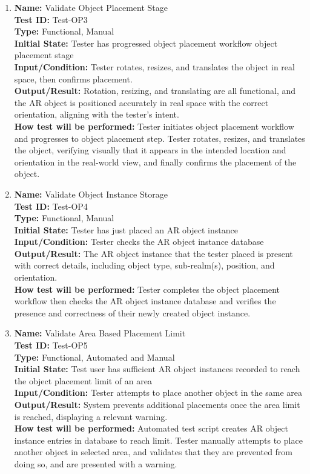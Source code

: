 \documentclass[12pt, titlepage]{article}
\begin{document}
\begin{enumerate}
\item \textbf{Name:} Validate Object Placement Stage \label{itm:Test-OP3} \\
\textbf{Test ID:} Test-OP3 \\
\textbf{Type:} Functional, Manual \\
\textbf{Initial State:} Tester has progressed object placement workflow object placement stage \\
\textbf{Input/Condition:} Tester rotates, resizes, and translates the object in real space, then confirms placement. \\
\textbf{Output/Result:} Rotation, resizing, and translating are all functional, and the AR object is positioned accurately in real space with the correct orientation, aligning with the tester's intent. \\
\textbf{How test will be performed:} Tester initiates object placement workflow and progresses to object placement step. Tester rotates, resizes, and translates the object, verifying visually that it appears in the intended location and orientation in the real-world view, and finally confirms the placement of the object.

\item \textbf{Name:} Validate Object Instance Storage \label{itm:Test-OP4} \\
\textbf{Test ID:} Test-OP4 \\
\textbf{Type:} Functional, Manual \\
\textbf{Initial State:} Tester has just placed an AR object instance \\
\textbf{Input/Condition:} Tester checks the AR object instance database \\
\textbf{Output/Result:} The AR object instance that the tester placed is present with correct details, including object type, sub-realm(s), position, and orientation. \\
\textbf{How test will be performed:} Tester completes the object placement workflow then checks the AR object instance database and verifies the presence and correctness of their newly created object instance.


\item \textbf{Name:} Validate Area Based Placement Limit \label{itm:Test-OP5} \\
\textbf{Test ID:} Test-OP5 \\
\textbf{Type:} Functional, Automated and Manual \\
\textbf{Initial State:} Test user has sufficient AR object instances recorded to reach the object placement limit of an area  \\
\textbf{Input/Condition:} Tester attempts to place another object in the same area \\
\textbf{Output/Result:} System prevents additional placements once the area limit is reached, displaying a relevant warning. \\
\textbf{How test will be performed:} Automated test script creates AR object instance entries in database to reach limit. Tester manually attempts to place another object in selected area, and validates that they are prevented from doing so, and are presented with a warning.


\end{enumerate}
\end{document}
